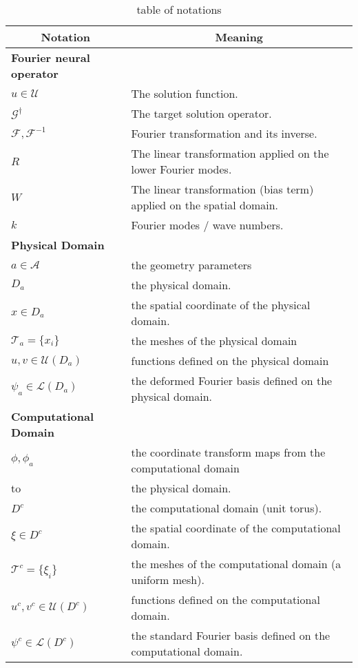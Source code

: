 \documentclass{article}
\newcommand{\F}{\mathcal{F}}
\newcommand{\Gtrue}{\mathcal{G}^{\dagger}}
\newcommand{\T}{\mathcal{T}}
\begin{document}
\begin{table}[h]
\caption{table of notations}
\label{table:notations}
\begin{center}
\begin{tabular}{|l|l|}
\multicolumn{1}{c}{\bf Notation} 
&\multicolumn{1}{c}{\bf Meaning}\\
\hline
{\bf Fourier neural operator} &\\
$u \in \mathcal{U}$ & The solution function.\\
$\Gtrue$ & The target solution operator.\\
$\F, \F^{-1}$ & Fourier transformation and its inverse.\\
$R$ & The linear transformation applied on the lower Fourier modes.\\
$W$ & The linear transformation (bias term) applied on the spatial domain. \\
$k$ & Fourier modes / wave numbers.\\
\hline
{\bf Physical Domain} &\\
$a \in \mathcal{A}$  & the geometry parameters \\
$D_a$  & the physical domain. \\
$x \in D_a$  & the spatial coordinate of the physical domain. \\
$\T_a = \{x_i\}$  & the meshes of the physical domain  \\
$u, v \in \mathcal{U}(D_a)$ & functions defined on the physical domain\\
$\psi_a \in \mathcal{L}(D_a)$ & the deformed Fourier basis defined on the physical domain.\\
\hline
{\bf Computational Domain} &\\
$\phi, \phi_a$ & the coordinate transform maps from the computational domain \\ to & the physical domain.\\
$D^c$  & the computational domain (unit torus). \\
$\xi \in D^c$  & the spatial coordinate of the computational domain. \\
$\T^c = \{\xi_i\}$  & the meshes of the computational domain  (a uniform mesh). \\
$u^c, v^c \in \mathcal{U}(D^c)$ & functions defined on the computational domain.\\
$\psi^c \in \mathcal{L}(D^c)$ & the standard Fourier basis defined on the computational domain.\\
\hline
\end{tabular}
\end{center}
\end{table}
\end{document}
